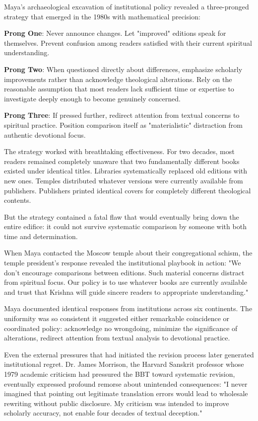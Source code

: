 \documentclass[11pt,twoside]{book}
\begin{document}
Maya's archaeological excavation of institutional policy revealed a three-pronged strategy that emerged in the 1980s with mathematical precision:

\textbf{\textbf{Prong One}}: Never announce changes. Let "improved" editions speak for themselves. Prevent confusion among readers satisfied with their current spiritual understanding.

\textbf{\textbf{Prong Two}}: When questioned directly about differences, emphasize scholarly improvements rather than acknowledge theological alterations. Rely on the reasonable assumption that most readers lack sufficient time or expertise to investigate deeply enough to become genuinely concerned.

\textbf{\textbf{Prong Three}}: If pressed further, redirect attention from textual concerns to spiritual practice. Position comparison itself as "materialistic" distraction from authentic devotional focus.

The strategy worked with breathtaking effectiveness. For two decades, most readers remained completely unaware that two fundamentally different books existed under identical titles. Libraries systematically replaced old editions with new ones. Temples distributed whatever versions were currently available from publishers. Publishers printed identical covers for completely different theological contents.

But the strategy contained a fatal flaw that would eventually bring down the entire edifice: it could not survive systematic comparison by someone with both time and determination.

When Maya contacted the Moscow temple about their congregational schism, the temple president's response revealed the institutional playbook in action: "We don't encourage comparisons between editions. Such material concerns distract from spiritual focus. Our policy is to use whatever books are currently available and trust that Krishna will guide sincere readers to appropriate understanding."

Maya documented identical responses from institutions across six continents. The uniformity was so consistent it suggested either remarkable coincidence or coordinated policy: acknowledge no wrongdoing, minimize the significance of alterations, redirect attention from textual analysis to devotional practice.

Even the external pressures that had initiated the revision process later generated institutional regret. Dr. James Morrison, the Harvard Sanskrit professor whose 1979 academic criticism had pressured the BBT toward systematic revision, eventually expressed profound remorse about unintended consequences: "I never imagined that pointing out legitimate translation errors would lead to wholesale rewriting without public disclosure. My criticism was intended to improve scholarly accuracy, not enable four decades of textual deception."
\end{document}
